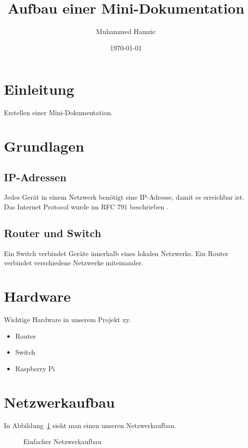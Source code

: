 \documentclass[12pt,a4paper]{article}
\title{Aufbau einer Mini-Dokumentation}
\author{Muhammed Hamzic}
\date{\today}
\begin{document}
\maketitle
\section{Einleitung}
Erstellen einer Mini-Dokumentation.
\section{Grundlagen}    
\subsection{IP-Adressen}
Jedes Gerät in einem Netzwerk benötigt
eine IP-Adresse, damit es erreichbar ist.
Das Internet Protocol wurde im RFC 791
beschrieben \cite{postel1981}.
\subsection{Router und Switch}
Ein Switch verbindet Geräte innerhalb
eines lokalen Netzwerks. Ein Router
verbindet verschiedene Netzwerke miteinander.


\section{Hardware}
Wichtige Hardware in unserem Projekt xy. 

\begin{itemize}
    \item Router
    \item Switch
    \item Raspberry Pi
\end{itemize}


\section{Netzwerkaufbau}

In Abbildung~\ref{fig:netzwerk} sieht man
einen unseren Netzwerkaufbau.

\begin{figure}[H]
\centering
{}
\caption{Einfacher Netzwerkaufbau}
\label{fig:netzwerk}
\end{figure}
\end{document}
